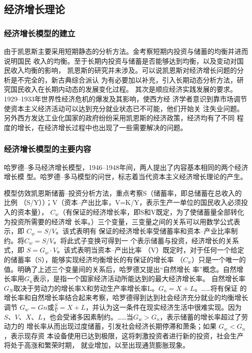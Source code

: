\subsection{经济增长理论}

\subsubsection{经济增长模型的建立}

由于凯恩斯主要采用短期静态的分析方法。金考察短期内投资与储蓄的均衡并进而说明国民
收入的均衡。至于长期内投资与储蓄是否能够达到均衡，以及变动对国民收入均衡的影响，
凯恩斯的研究并未涉及。可以说凯恩斯对经济增长问题的分析是不完全的，新古典综合派认
为有必要加以补充，引入长期动态分析方法，研究国民收入在长期内动态的发展变化过程。
其次是顺应经济实践发展的要求。1929--1933年世界性经济危机的爆发及其影响，使西方经
济学者意识到靠市场调节使资本主义经济活动可以达到充分就业状态已不可能，他们开始关
注失业问题。另外西方发达工业化国家的政府纷纷采用凯恩斯的经济政策，经济均有了不同
程度的增长，在经济增长过程中也出现了一些需要解决的问题。

\subsubsection{经济增长模型的主要内容}

哈罗德--多马经济增长模型，1946--1948年间，两人提出了内容基本相同的两个经济增长模
型。哈罗德--多马模型的问世，标志着当代资本主义经济增长理论的产生。

模型仿效凯恩斯储蓄--投资分析方法，重点考察S（储蓄率，即总储蓄在总收入的比例
（S/Y））；V（资本--产出比率，V=K/Y，表示生产一单位的国民收入必须投入的资本量），
$C_w$（有保证的经济增长率，即S和V既定，为了使储蓄量全部转化为投资所需要的经济增
长率。）三个变量，三变量之间的关系可以用数学公式表示，即 $C_w = S/V$。该式表明有
保证的经济增长率受储蓄率和资本--产业比率制约。将$C_w=S/V$。将此式子变换可得到一
个表示储蓄与投资，经济增长的关系式，即 $S=G_w \cdot V$。该式表明当资本--产出比率
（V）既定时，对于任何一个给定的储蓄率（S），能够实现经济均衡增长的有保证的增长率
（$C_w$）只是一个唯一的值。明确了上述三个变量间的关系后，哈罗德又提出“自然增长
率”概念。自然增长率用$G_n$表示，是指一个国家经济活动所能达到的最大经济增长率。
自然增长率$G_N$取决于劳动力的增长率X和劳动生产率增长率L。$G_n=X+L$。……将有保证
的增长率和自然增长率结合起来考察，哈罗德得到达到社会经济充分就业的均衡增长调节
$G_w = Gn$或$\tfrac{S}{V}=X+L$，并认为这一条件在现实经济生活中很难实现。因为$S、
V、X、L$，也会受诸多因素制约。……当$G_w > G_n$，表示储蓄的增长率超过了劳动力的
增长率从而出现过度储蓄，引发社会经济长期停滞和萧条；如果 $G_w < G_n$，表示现存资
本设备使用已达到极限，这将刺激投资者进行新的投资，社会生产将处于高涨和繁荣时期，
就业增加，以至出现通货膨胀现象。

